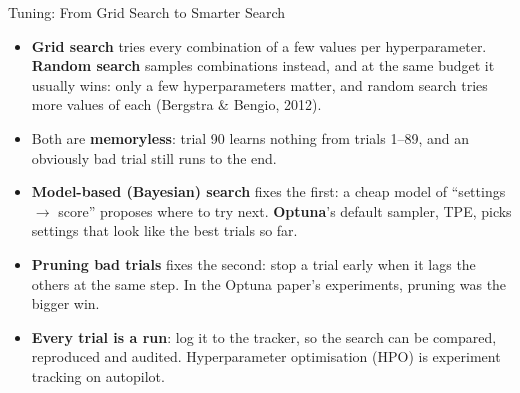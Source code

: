 \begin{frame}{Tuning: From Grid Search to Smarter Search}
    \begin{itemize}
        \setlength\itemsep{0.45em}
        \item \textbf{Grid search} tries every combination of a few values per hyperparameter. \textbf{Random search}
              samples combinations instead, and at the same budget it usually wins: only a few hyperparameters
              matter, and random search tries more values of each (Bergstra \& Bengio, 2012).
        \item Both are \textbf{memoryless}: trial 90 learns nothing from trials 1--89, and an obviously bad trial
              still runs to the end.
        \item \textbf{Model-based (Bayesian) search} fixes the first: a cheap model of ``settings $\rightarrow$ score''
              proposes where to try next. \textbf{Optuna}'s default sampler, TPE, picks settings that look like the
              best trials so far.
        \item \textbf{Pruning bad trials} fixes the second: stop a trial early when it lags the others at the same
              step. In the Optuna paper's experiments, pruning was the bigger win.
        \item \textbf{Every trial is a run}: log it to the tracker, so the search can be compared, reproduced and
              audited. Hyperparameter optimisation (HPO) is experiment tracking on autopilot.
    \end{itemize}
\end{frame}
